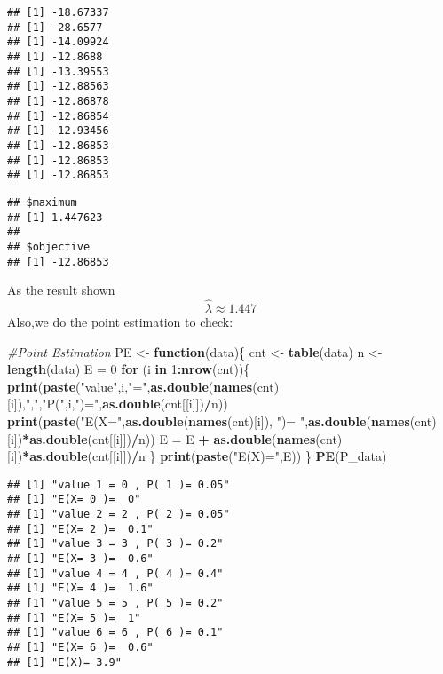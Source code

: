 \documentclass[]{article}
\newenvironment{Shaded}{\begin{snugshade}}{\end{snugshade}}
\newcommand{\KeywordTok}[1]{\textcolor[rgb]{0.13,0.29,0.53}{\textbf{#1}}}
\newcommand{\DecValTok}[1]{\textcolor[rgb]{0.00,0.00,0.81}{#1}}
\newcommand{\StringTok}[1]{\textcolor[rgb]{0.31,0.60,0.02}{#1}}
\newcommand{\CommentTok}[1]{\textcolor[rgb]{0.56,0.35,0.01}{\textit{#1}}}
\newcommand{\ControlFlowTok}[1]{\textcolor[rgb]{0.13,0.29,0.53}{\textbf{#1}}}
\newcommand{\OperatorTok}[1]{\textcolor[rgb]{0.81,0.36,0.00}{\textbf{#1}}}
\newcommand{\NormalTok}[1]{#1}
\begin{document}
\begin{verbatim}
## [1] -18.67337
## [1] -28.6577
## [1] -14.09924
## [1] -12.8688
## [1] -13.39553
## [1] -12.88563
## [1] -12.86878
## [1] -12.86854
## [1] -12.93456
## [1] -12.86853
## [1] -12.86853
## [1] -12.86853
\end{verbatim}

\begin{verbatim}
## $maximum
## [1] 1.447623
## 
## $objective
## [1] -12.86853
\end{verbatim}

As the result shown \[ \hat { \lambda  } \approx 1.447 \] Also,we do the
point estimation to check:

\begin{Shaded}
\begin{Highlighting}[]
\CommentTok{#Point Estimation}
\NormalTok{PE <-}\StringTok{ }\ControlFlowTok{function}\NormalTok{(data)\{}
\NormalTok{    cnt <-}\StringTok{ }\KeywordTok{table}\NormalTok{(data)}
\NormalTok{    n <-}\StringTok{ }\KeywordTok{length}\NormalTok{(data)}
\NormalTok{    E =}\StringTok{ }\DecValTok{0}
    \ControlFlowTok{for}\NormalTok{ (i }\ControlFlowTok{in} \DecValTok{1}\OperatorTok{:}\KeywordTok{nrow}\NormalTok{(cnt))\{}
        \KeywordTok{print}\NormalTok{(}\KeywordTok{paste}\NormalTok{(}\StringTok{"value"}\NormalTok{,i,}\StringTok{"="}\NormalTok{,}\KeywordTok{as.double}\NormalTok{(}\KeywordTok{names}\NormalTok{(cnt)[i]),}\StringTok{","}\NormalTok{,}\StringTok{"P("}\NormalTok{,i,}\StringTok{")="}\NormalTok{,}\KeywordTok{as.double}\NormalTok{(cnt[[i]])}\OperatorTok{/}\NormalTok{n))}
        \KeywordTok{print}\NormalTok{(}\KeywordTok{paste}\NormalTok{(}\StringTok{"E(X="}\NormalTok{,}\KeywordTok{as.double}\NormalTok{(}\KeywordTok{names}\NormalTok{(cnt)[i]), }\StringTok{")= "}\NormalTok{,}\KeywordTok{as.double}\NormalTok{(}\KeywordTok{names}\NormalTok{(cnt)[i])}\OperatorTok{*}\KeywordTok{as.double}\NormalTok{(cnt[[i]])}\OperatorTok{/}\NormalTok{n))}
\NormalTok{        E =}\StringTok{ }\NormalTok{E }\OperatorTok{+}\StringTok{ }\KeywordTok{as.double}\NormalTok{(}\KeywordTok{names}\NormalTok{(cnt)[i])}\OperatorTok{*}\KeywordTok{as.double}\NormalTok{(cnt[[i]])}\OperatorTok{/}\NormalTok{n}
\NormalTok{    \}}
    \KeywordTok{print}\NormalTok{(}\KeywordTok{paste}\NormalTok{(}\StringTok{"E(X)="}\NormalTok{,E))}
\NormalTok{\}}
\KeywordTok{PE}\NormalTok{(P_data)}
\end{Highlighting}
\end{Shaded}

\begin{verbatim}
## [1] "value 1 = 0 , P( 1 )= 0.05"
## [1] "E(X= 0 )=  0"
## [1] "value 2 = 2 , P( 2 )= 0.05"
## [1] "E(X= 2 )=  0.1"
## [1] "value 3 = 3 , P( 3 )= 0.2"
## [1] "E(X= 3 )=  0.6"
## [1] "value 4 = 4 , P( 4 )= 0.4"
## [1] "E(X= 4 )=  1.6"
## [1] "value 5 = 5 , P( 5 )= 0.2"
## [1] "E(X= 5 )=  1"
## [1] "value 6 = 6 , P( 6 )= 0.1"
## [1] "E(X= 6 )=  0.6"
## [1] "E(X)= 3.9"
\end{verbatim}
\end{document}
